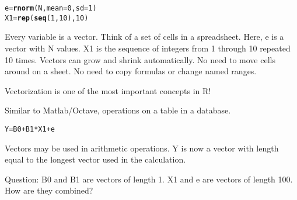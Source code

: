 \documentclass[xcolor=dvipsnames]{beamer}
\makeatletter
\newcommand{\hlnum}[1]{\textcolor[rgb]{0.686,0.059,0.569}{#1}}%
\newcommand{\hlopt}[1]{\textcolor[rgb]{0,0,0}{#1}}%
\newcommand{\hlstd}[1]{\textcolor[rgb]{0.345,0.345,0.345}{#1}}%
\newcommand{\hlkwb}[1]{\textcolor[rgb]{0.69,0.353,0.396}{#1}}%
\newcommand{\hlkwc}[1]{\textcolor[rgb]{0.333,0.667,0.333}{#1}}%
\newcommand{\hlkwd}[1]{\textcolor[rgb]{0.737,0.353,0.396}{\textbf{#1}}}%
\newenvironment{kframe}{%
 \def\at@end@of@kframe{}%
 \ifinner\ifhmode%
  \def\at@end@of@kframe{\end{minipage}}%
  \begin{minipage}{\columnwidth}%
 \fi\fi%
 \def\FrameCommand##1{\hskip\@totalleftmargin \hskip-\fboxsep
 \colorbox{shadecolor}{##1}\hskip-\fboxsep
     \hskip-\linewidth \hskip-\@totalleftmargin \hskip\columnwidth}%
 \MakeFramed {\advance\hsize-\width
   \@totalleftmargin\z@ \linewidth\hsize
   \@setminipage}}%
 {\par\unskip\endMakeFramed%
 \at@end@of@kframe}
\newenvironment{knitrout}{}{} %
\makeatother
\begin{document}
\begin{frame}[fragile]
\begin{knitrout}
\color{fgcolor}\begin{kframe}
\begin{alltt}
\hlstd{e} \hlkwb{=} \hlkwd{rnorm}\hlstd{(N,} \hlkwc{mean} \hlstd{=} \hlnum{0}\hlstd{,} \hlkwc{sd} \hlstd{=} \hlnum{1}\hlstd{)}
\hlstd{X1} \hlkwb{=} \hlkwd{rep}\hlstd{(}\hlkwd{seq}\hlstd{(}\hlnum{1}\hlstd{,} \hlnum{10}\hlstd{),} \hlnum{10}\hlstd{)}
\end{alltt}
\end{kframe}
\end{knitrout}


Every variable is a vector. Think of a set of cells in a spreadsheet. Here, e is a vector with N values. X1 is the sequence of integers from 1 through 10 repeated 10 times. Vectors can grow and shrink automatically. No need to move cells around on a sheet. No need to copy formulas or change named ranges.
\end{frame}

\begin{frame}[fragile]
Vectorization is one of the most important concepts in R!

Similar to Matlab/Octave, operations on a table in a database.
\begin{knitrout}
\color{fgcolor}\begin{kframe}
\begin{alltt}
\hlstd{Y} \hlkwb{=} \hlstd{B0} \hlopt{+} \hlstd{B1} \hlopt{*} \hlstd{X1} \hlopt{+} \hlstd{e}
\end{alltt}
\end{kframe}
\end{knitrout}

Vectors may be used in arithmetic operations. Y is now a vector with length equal to the longest vector used in the calculation.

Question: B0 and B1 are vectors of length 1. X1 and e are vectors of length 100. How are they combined?
\end{frame}
\end{document}
